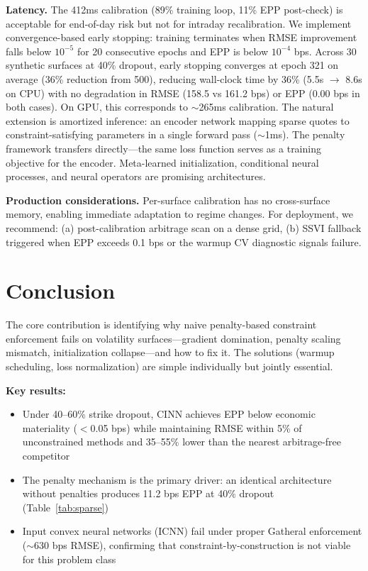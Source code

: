 \documentclass[11pt,a4paper]{article}
\begin{document}
\textbf{Latency.} The 412ms calibration (89\% training loop, 11\% EPP post-check) is acceptable for end-of-day risk but not for intraday recalibration. We implement convergence-based early stopping: training terminates when RMSE improvement falls below $10^{-5}$ for 20 consecutive epochs and EPP is below $10^{-4}$ bps. Across 30 synthetic surfaces at 40\% dropout, early stopping converges at epoch 321 on average (36\% reduction from 500), reducing wall-clock time by 36\% (5.5s $\to$ 8.6s on CPU) with no degradation in RMSE (158.5 vs 161.2 bps) or EPP (0.00 bps in both cases). On GPU, this corresponds to ${\sim}$265ms calibration. The natural extension is amortized inference: an encoder network mapping sparse quotes to constraint-satisfying parameters in a single forward pass (${\sim}$1ms). The penalty framework transfers directly---the same loss function serves as a training objective for the encoder. Meta-learned initialization, conditional neural processes, and neural operators are promising architectures.

\textbf{Production considerations.} Per-surface calibration has no cross-surface memory, enabling immediate adaptation to regime changes. For deployment, we recommend: (a) post-calibration arbitrage scan on a dense grid, (b) SSVI fallback triggered when EPP exceeds 0.1 bps or the warmup CV diagnostic signals failure.

\section{Conclusion}
\label{sec:conclusion}

The core contribution is identifying why naive penalty-based constraint enforcement fails on volatility surfaces---gradient domination, penalty scaling mismatch, initialization collapse---and how to fix it. The solutions (warmup scheduling, loss normalization) are simple individually but jointly essential.

\textbf{Key results:}
\begin{itemize}
    \item Under 40--60\% strike dropout, CINN achieves EPP below economic materiality ($<$0.05 bps) while maintaining RMSE within 5\% of unconstrained methods and 35--55\% lower than the nearest arbitrage-free competitor
    \item The penalty mechanism is the primary driver: an identical architecture without penalties produces 11.2 bps EPP at 40\% dropout (Table~\ref{tab:sparse})
    \item Input convex neural networks (ICNN) fail under proper Gatheral enforcement (${\sim}$630 bps RMSE), confirming that constraint-by-construction is not viable for this problem class
\end{itemize}
\end{document}

